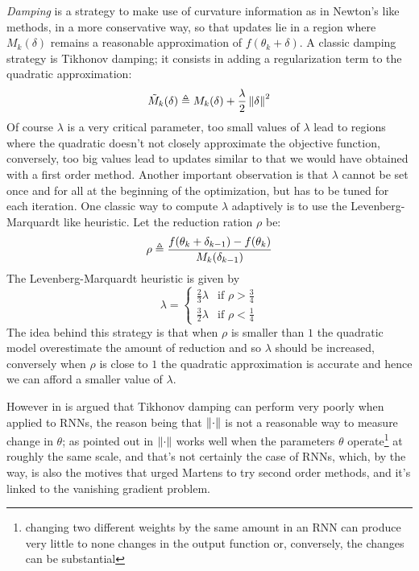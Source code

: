 \textit{Damping} is a strategy to make use of curvature information as in Newton's like methods, in a more conservative way, so that updates lie in a region where $M_k(\delta)$ remains a reasonable approximation of $f(\theta_k+\delta)$. 
A classic damping strategy is Tikhonov damping; it consists in adding a regularization term to the quadratic approximation:
\begin{equation}
 \tilde{M}_k(\delta) \triangleq  M_k(\delta) + \frac{\lambda}{2} \left\Vert \delta \right\Vert^2
\end{equation}
Of course $\lambda$ is a very critical parameter, too small values of $\lambda$ lead to regions where the quadratic doesn't not closely approximate the objective function, conversely, too big values lead to updates similar to that we would have obtained with a first order method. Another important observation is that $\lambda$ cannot be set once and for all at the beginning of the optimization, but has to be tuned for each iteration. One classic way to compute $\lambda$ adaptively is to use the Levenberg-Marquardt like heuristic.
Let the reduction ration $\rho$ be:
\begin{equation}
 \rho \triangleq \frac{f(\theta_k + \delta_{k-1})-f(\theta_k)}{M_k(\delta_{k-1})}
\end{equation}
The Levenberg-Marquardt  heuristic is given by
\begin{equation} 
 \lambda = 
 \begin{cases} 
    \frac{2}{3}\lambda &\mbox{if } \rho > \frac{3}{4} \\ 
    \frac{3}{2}\lambda &\mbox{if } \rho < \frac{1}{4} 
  \end{cases} 
\end{equation}
The idea behind this strategy is that when $\rho$ is smaller than $1$ the quadratic model overestimate the amount of reduction and so $\lambda$ should be increased, conversely when $\rho$ is close to $1$ the quadratic approximation is accurate and hence we can afford a smaller value of $\lambda$.

However in \cite{hessianFree} is argued that Tikhonov damping can perform very poorly when applied to RNNs, the reason being that $\left\Vert \cdot \right\Vert$ is not a reasonable way to measure change in $\theta$; as pointed out in \cite{hessianFree} $\left\Vert \cdot \right\Vert$ works well when the parameters $\theta$ operate\footnote{changing two different weights by the same amount in an RNN can produce very little to none changes in the output function or, conversely, the changes can be substantial} at roughly the same scale, and that's not certainly the case of RNNs, which, by the way, is also the motives that urged Martens to try second order methods, and it's linked to the vanishing gradient problem. 

